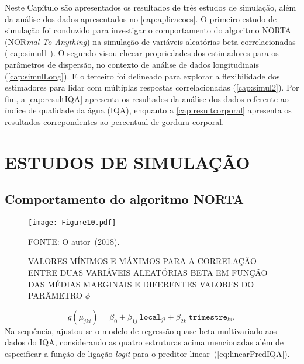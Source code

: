 
Neste Capítulo são apresentados os resultados de três estudos de
simulação, além da análise dos dados apresentados no
\autoref{cap:aplicacoes}. O primeiro estudo de simulação foi conduzido
para investigar o comportamento do algoritmo NORTA (NOR\textit{mal To
  Anything}) na simulação de variáveis aleatórias beta correlacionadas
(\autoref{cap:simul1}). O segundo visou checar propriedades dos
estimadores para os parâmetros de dispersão, no contexto de análise de
dados longitudinais (\autoref{cap:simulLong}). E o terceiro foi
delineado para explorar a flexibilidade dos estimadores para lidar com
múltiplas respostas correlacionadas (\autoref{cap:simul2}). Por fim, a
\autoref{cap:resultIQA} apresenta os resultados da análise dos dados
referente ao índice de qualidade da água (IQA), enquanto a
\autoref{cap:resultcorporal} apresenta os resultados correpondentes ao
percentual de gordura corporal.

\section{ESTUDOS DE SIMULAÇÃO}

\subsection{Comportamento do algoritmo NORTA}
\label{cap:simul1}

\begin{figure}[H]
  \vspace{0.4cm}
  \caption{VALORES MÍNIMOS E MÁXIMOS PARA A CORRELAÇÃO ENTRE DUAS
    VARIÁVEIS ALEATÓRIAS BETA EM FUNÇÃO DAS MÉDIAS MARGINAIS E
    DIFERENTES VALORES DO PARÂMETRO $\phi$}
  \setlength{\abovecaptionskip}{.0001pt}
  \vspace{-0.38cm}
  \texttt{[image: Figure10.pdf]}
  \vspace{-0.7cm}
  \begin{footnotesize}
    \centering
    FONTE: O autor~(2018).
    \vspace{0.15cm}
  \end{footnotesize}
  \label{fig:simulnorta}
\end{figure}

\begin{equation}
  \label{eq:linearPredIQA}
  g(\mu_{jki}) = \beta_0  + \beta_{1j}~\texttt{local}_{ji} + \beta_{2k}~\texttt{trimestre}_{ki},
\end{equation}
\noindent
Na sequência, ajustou-se o modelo de regressão quase-beta multivariado
aos dados do IQA, considerando as quatro estruturas acima mencionadas
além de especificar a função de ligação \textit{logit} para o preditor
linear~(\autoref{eq:linearPredIQA}).

